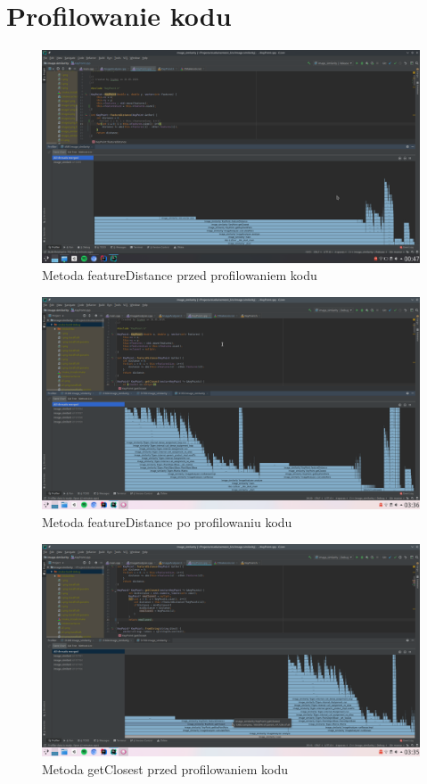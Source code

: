 \documentclass{article}
\begin{document}
	\section{Profilowanie kodu}
	\begin{figure}[H]
		\centering
		\includegraphics[width=\linewidth]{before.png}
		\caption{Metoda featureDistance przed profilowaniem kodu}
		\label{fig:before1}
	\end{figure}
	\begin{figure}[H]
		\centering
		\includegraphics[width=\linewidth]{after1.png}
		\caption{Metoda featureDistance po profilowaniu kodu}
		\label{fig:after1}
	\end{figure}
	\begin{figure}[H]
		\centering
		\includegraphics[width=\linewidth]{before3.png}
		\caption{Metoda getClosest przed profilowaniem kodu}
		\label{fig:before2}
	\end{figure}
\end{document}
